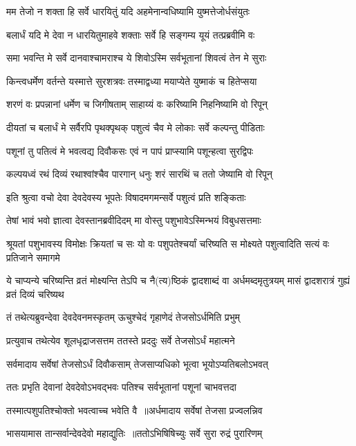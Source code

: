 \twolineshloka
{मम तेजो न शक्ता हि सर्वे धारयितुं यदि}
{अहमेनान्वधिष्यामि युष्मत्तेजोर्धसंयुतः}


\twolineshloka
{बलार्धं यदि मे देवा न धारयितुमाहवे}
{शक्ताः सर्वे हि सङ्गम्य यूयं तत्प्रब्रवीमि वः}


\twolineshloka
{समा भवन्ति मे सर्वे दानवाश्चामराश्च ये}
{शिवोऽस्मि सर्वभूतानां शिवत्वं तेन मे सुराः}


\twolineshloka
{किन्त्वधर्मेण वर्तन्ते यस्मात्ते सुरशत्रवः}
{तस्माद्वध्या मयाप्येते युष्माकं च हितेप्सया}


\twolineshloka
{शरणं वः प्रपन्नानां धर्मेण च जिगीषताम्}
{साहाय्यं वः करिष्यामि निहनिष्यामि वो रिपून्}


\twolineshloka
{दीयतां च बलार्धं मे सर्वैरपि पृथक्पृथक्}
{पशुत्वं चैव मे लोकाः सर्वे कल्पन्तु पीडिताः}


\twolineshloka
{पशूनां तु पतित्वं मे भवत्वद्य दिवौकसः}
{एवं न पापं प्राप्स्यामि पशून्हत्वा सुरद्विपः}


\twolineshloka
{कल्पयध्वं रथं दिव्यं रथाश्वांश्चैव पारगान्}
{धनुः शरं सारथिं च ततो जेष्यामि वो रिपून्}


\twolineshloka
{इति श्रुत्वा वचो देवा देवदेवस्य भूपतेः}
{विषादमगमन्सर्वे पशुत्वं प्रति शङ्किताः}


\twolineshloka
{तेषां भावं भवो ज्ञात्वा देवस्तानब्रवीदिदम्}
{मा वोस्तु पशुभावेऽस्मिन्भयं विबुधसत्तमाः}


श्रूयतां पशुभावस्य विमोक्षः क्रियतां च सः
\twolineshloka
{यो वः पशुपतेश्चर्यां चरिष्यति स मोक्ष्यते}
{पशुत्वादिति सत्यं वः प्रतिजाने समागमे}


ये चाप्यन्ये चरिष्यन्ति व्रतं मोक्ष्यन्ति तेऽपि च
\twolineshloka
{नै(त्य)ष्ठिकं द्वादशाब्दं वा अर्धमब्दमृतुत्रयम्}
{मासं द्वादशरात्रं गुह्यं व्रतं दिव्यं चरिष्यथ}


\twolineshloka
{तं तथेत्यब्रुवन्देवा देवदेवनमस्कृतम्}
{ऊचुश्चेदं गृहाणेदं तेजसोऽर्धमिति प्रभुम्}


\twolineshloka
{प्रत्युवाच तथेत्येव शूलधृद्राजसत्तम}
{ततस्ते प्रददुः सर्वे तेजसोऽर्धं महात्मने}


\twolineshloka
{सर्वमादाय सर्वेषां तेजसोऽर्धं दिवौकसाम्}
{तेजसाप्यधिको भूत्वा भूयोऽप्यतिबलोऽभवत्}


\twolineshloka
{ततः प्रभृति देवानां देवदेवोऽभवद्भवः}
{पतिश्च सर्वभूतानां पशूनां चाभवत्तदा}


\twolineshloka
{तस्मात्पशुपतिश्चोक्तो भवत्वाच्च भवेति वै ॥अर्धमादाय सर्वेषां तेजसा प्रज्वलन्निव}
{}


\twolineshloka
{भासयामास तान्सर्वान्देवदेवो महाद्युतिः ॥ततोऽभिषिषिच्युः सर्वे सुरा रुद्रं पुरारिणम्}
{}


